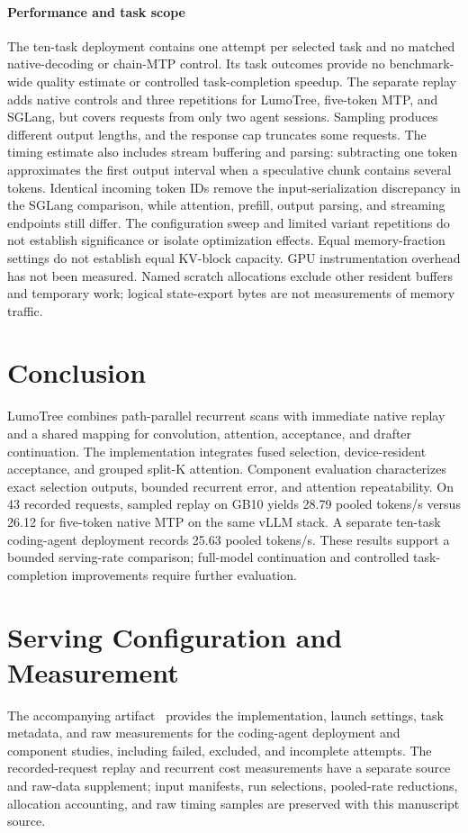 \documentclass[conference]{IEEEtran}
\newcommand{\sys}{LumoTree}
\begin{document}
\paragraph{Performance and task scope}
The ten-task deployment contains one attempt per selected task and no matched native-decoding or chain-MTP control. Its task outcomes provide no benchmark-wide quality estimate or controlled task-completion speedup. The separate replay adds native controls and three repetitions for \sys{}, five-token MTP, and SGLang, but covers requests from only two agent sessions. Sampling produces different output lengths, and the response cap truncates some requests. The timing estimate also includes stream buffering and parsing: subtracting one token approximates the first output interval when a speculative chunk contains several tokens. Identical incoming token IDs remove the input-serialization discrepancy in the SGLang comparison, while attention, prefill, output parsing, and streaming endpoints still differ. The configuration sweep and limited variant repetitions do not establish significance or isolate optimization effects. Equal memory-fraction settings do not establish equal KV-block capacity. GPU instrumentation overhead has not been measured. Named scratch allocations exclude other resident buffers and temporary work; logical state-export bytes are not measurements of memory traffic.

\section{Conclusion}
\sys{} combines path-parallel recurrent scans with immediate native replay and a shared mapping for convolution, attention, acceptance, and drafter continuation. The implementation integrates fused selection, device-resident acceptance, and grouped split-K attention. Component evaluation characterizes exact selection outputs, bounded recurrent error, and attention repeatability. On 43 recorded requests, sampled replay on GB10 yields 28.79 pooled tokens/s versus 26.12 for five-token native MTP on the same vLLM stack. A separate ten-task coding-agent deployment records 25.63 pooled tokens/s. These results support a bounded serving-rate comparison; full-model continuation and controlled task-completion improvements require further evaluation.

\appendices
\section{Serving Configuration and Measurement}
\label{app:audit}
\label{app:settings}
The accompanying artifact~\cite{lumo2026archive} provides the implementation, launch settings, task metadata, and raw measurements for the coding-agent deployment and component studies, including failed, excluded, and incomplete attempts. The recorded-request replay and recurrent cost measurements have a separate source and raw-data supplement; input manifests, run selections, pooled-rate reductions, allocation accounting, and raw timing samples are preserved with this manuscript source.

\end{document}

